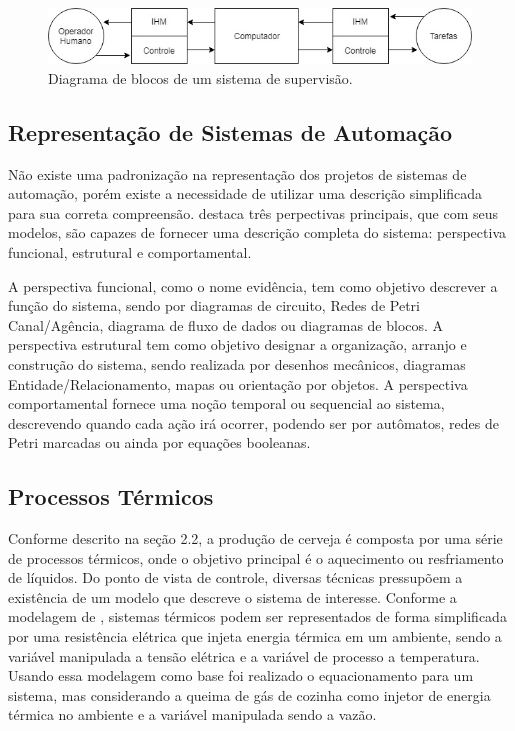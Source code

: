 \begin{figure}[htb]
	\caption{\label{filtracao01} Diagrama de blocos de um sistema de supervisão.}
	\begin{center}
	    \includegraphics[width=0.75\linewidth]{./img/SistemaSCADA.jpg}
	\end{center}
\end{figure}


			\subsection{Representação de Sistemas de Automação}
Não existe uma padronização na representação dos projetos de sistemas de automação, porém existe a necessidade de utilizar uma descrição simplificada para sua correta compreensão.  destaca três perpectivas principais, que com seus modelos, são capazes de fornecer uma descrição completa do sistema: perspectiva funcional, estrutural e comportamental.

A perspectiva funcional, como o nome evidência, tem como objetivo descrever a função do sistema, sendo por diagramas de circuito, Redes de Petri Canal/Agência, diagrama de fluxo de dados ou diagramas de blocos. A perspectiva estrutural tem como objetivo designar a organização, arranjo e construção do sistema, sendo realizada por desenhos mecânicos, diagramas Entidade/Relacionamento, mapas ou orientação por objetos. A perspectiva comportamental fornece uma noção temporal ou sequencial ao sistema, descrevendo quando cada ação irá ocorrer, podendo ser por autômatos, redes de Petri marcadas ou ainda por equações booleanas. 

			\subsection{Processos Térmicos}
Conforme descrito na seção 2.2, a produção de cerveja é composta por uma série de processos térmicos, onde o objetivo principal é o aquecimento ou resfriamento de líquidos. Do ponto de vista de controle, diversas técnicas pressupõem a existência de um modelo que descreve o sistema de interesse. Conforme a modelagem de , sistemas térmicos podem ser representados de forma simplificada por uma resistência elétrica que injeta energia térmica em um ambiente, sendo a variável manipulada a tensão elétrica e a variável de processo a temperatura. Usando essa modelagem como base foi realizado o equacionamento para um sistema, mas considerando a queima de gás de cozinha como injetor de energia térmica no ambiente e a variável manipulada sendo a vazão.

